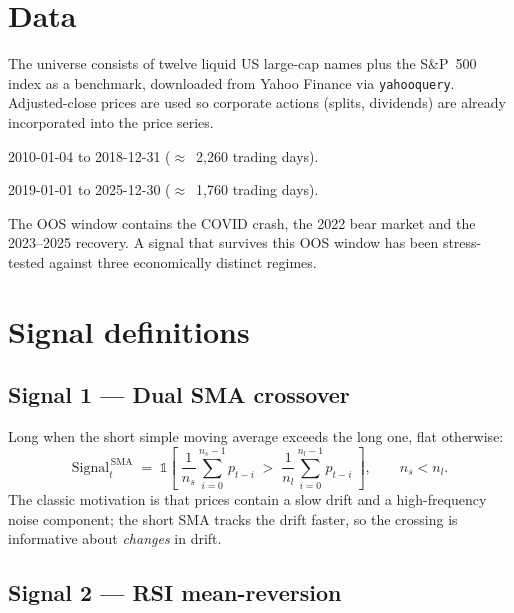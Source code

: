 \documentclass[11pt,a4paper]{article}
\begin{document}
\section{Data}

The universe consists of twelve liquid US large-cap names plus the S\&P~500
index as a benchmark, downloaded from Yahoo Finance via \texttt{yahooquery}.
Adjusted-close prices are used so corporate actions (splits, dividends) are
already incorporated into the price series.

\begin{description}[leftmargin=1.4cm,labelwidth=1.2cm,style=nextline,nosep]
  \item[\textbf{In-sample (calibration)}] 2010-01-04 to 2018-12-31 ($\approx$~2{,}260 trading days).
  \item[\textbf{Out-of-sample (validation)}] 2019-01-01 to 2025-12-30 ($\approx$~1{,}760 trading days).
\end{description}

The OOS window contains the COVID crash, the 2022 bear market and the
2023--2025 recovery. A signal that survives this OOS window has been
stress-tested against three economically distinct regimes.

\section{Signal definitions}

\subsection{Signal 1 --- Dual SMA crossover}

Long when the short simple moving average exceeds the long one, flat
otherwise:
\begin{equation}
\mathrm{Signal}^{\,\mathrm{SMA}}_{t} \;=\; \mathbb{1}\!\left[\;
  \frac{1}{n_s}\sum_{i=0}^{n_s - 1} p_{t-i} \;>\;
  \frac{1}{n_l}\sum_{i=0}^{n_l - 1} p_{t-i}
\;\right], \qquad n_s < n_l.
\label{eq:sma}
\end{equation}
The classic motivation \citep{Brock1992,Marshall2017} is that prices contain a
slow drift and a high-frequency noise component; the short SMA tracks the
drift faster, so the crossing is informative about \emph{changes} in drift.

\subsection{Signal 2 --- RSI mean-reversion}
\end{document}
